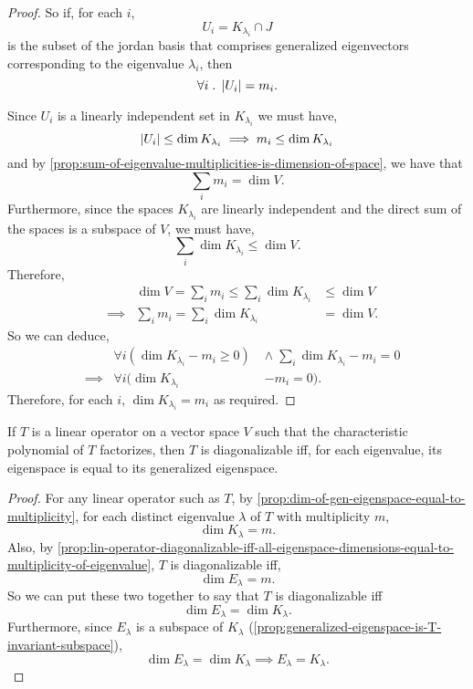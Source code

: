 \documentclass[../MathsNotesBase.tex]{subfiles}
\begin{document}
{\begin{proof}
			So if, for each $i$, 
			\[ U_i = K_{\lambda_i} \cap J \]
			is the subset of the jordan basis that comprises generalized eigenvectors corresponding to the eigenvalue $\lambda_i$, then
			\[ \forall i \;.\; \left\lvert U_i\right\rvert = m_i. \]
			
			Since $U_i$ is a linearly independent set in $K_{\lambda_i}$ we must have,
			\[ \left\lvert U_i\right\rvert \leq \dim K_{\lambda_i} \implies m_i \leq \dim K_{\lambda_i} \]
			and by \autoref{prop:sum-of-eigenvalue-multiplicities-is-dimension-of-space}, we have that
			\[ \sum_i m_i = \dim V. \]
			Furthermore, since the spaces $K_{\lambda_i}$ are linearly independent and the direct sum of the spaces is a subspace of $V$, we must have,
			\[ \sum_i \dim K_{\lambda_i} \leq \dim V. \]
			Therefore,
			\[\begin{aligned}
				&& \dim V = \sum_i m_i \leq \sum_i \dim K_{\lambda_i} &\leq \dim V \\
				&\implies & \sum_i m_i = \sum_i \dim K_{\lambda_i} &= \dim V.
			\end{aligned}\]
			So we can deduce,
			\[\begin{aligned}
				&& \forall i (\dim K_{\lambda_i} - m_i \geq 0) \; &\land \; \sum_i \dim K_{\lambda_i} - m_i = 0 \\
				&\implies & \forall i (\dim K_{\lambda_i} &- m_i = 0).
			\end{aligned}\]
			Therefore, for each $i$, ${ \dim K_{\lambda_i} = m_i }$ as required.	
		\end{proof}
		\begin{corollary}
			If $T$ is a linear operator on a vector space $V$ such that the characteristic polynomial of $T$ factorizes, then $T$ is diagonalizable iff, for each eigenvalue, its eigenspace is equal to its generalized eigenspace.
		\end{corollary}
		\begin{proof}
			For any linear operator such as $T$, by \autoref{prop:dim-of-gen-eigenspace-equal-to-multiplicity}, for each distinct eigenvalue $\lambda$ of $T$ with multiplicity $m$,
			\[ \dim K_\lambda = m. \]
			Also, by \autoref{prop:lin-operator-diagonalizable-iff-all-eigenspace-dimensions-equal-to-multiplicity-of-eigenvalue}, $T$ is diagonalizable iff, 
			\[ \dim E_\lambda = m. \]
			So we can put these two together to say that $T$ is diagonalizable iff
			\[ \dim E_\lambda = \dim K_\lambda. \]
			Furthermore, since $E_\lambda$ is a subspace of $K_\lambda$ (\autoref{prop:generalized-eigenspace-is-T-invariant-subspace}),
			\[ \dim E_\lambda = \dim K_\lambda \implies E_\lambda = K_\lambda. \]

\end{proof}}
\end{document}
